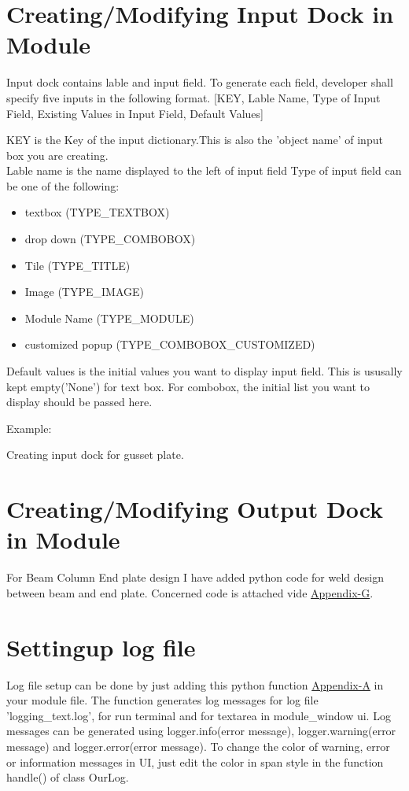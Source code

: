 \documentclass[11pt,a4paper]{report}
\begin{document}
\section{Creating/Modifying Input Dock in Module}
\noindent Input dock contains lable and input field. To generate each field, developer shall specify five inputs in the following format.
[KEY, Lable Name, Type of Input Field, Existing Values in Input Field, Default Values]

KEY is the Key of the input dictionary.This is also the 'object name' of input box you are creating.\\ 
Lable name is the name displayed to the left of input field
Type of input field can be one of the following:
\begin{itemize}
\item textbox (TYPE\_TEXTBOX)
\item drop down (TYPE\_COMBOBOX)
\item Tile (TYPE\_TITLE)
\item Image (TYPE\_IMAGE)
\item Module Name (TYPE\_MODULE)
\item customized popup (TYPE\_COMBOBOX\_CUSTOMIZED)
\end{itemize} 

Default values is the initial values you want to display input field. This is ususally kept empty('None') for text box. For combobox, the initial list you want to display should be passed here.

Example:

Creating input dock for gusset plate.




\section{Creating/Modifying Output Dock in Module}
\noindent For Beam Column End plate design I have added python code for weld design between beam and end plate. Concerned code is attached vide \hyperlink {page.102}{Appendix-G}.

\section{Settingup log file}
\noindent Log file setup can be done by just adding this python function \hyperlink {page.10}{Appendix-A} in your module file. The function generates log messages for log file 'logging\_text.log', for run terminal and for textarea in module\_window ui. Log messages can be generated using logger.info(error message), logger.warning(error message) and logger.error(error message). To change the color of warning, error or information messages in UI, just edit the color in span style in the function handle() of class OurLog.
\end{document}
